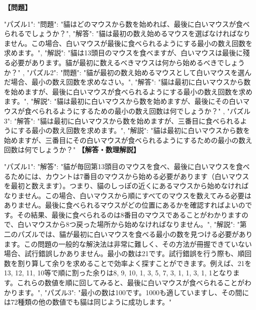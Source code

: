 \documentclass[10pt,a4paper,oneside,openany]{ltjsbook}
\begin{document}
\begin{tcolorbox}[colback=softblue,colframe=primaryblue,title=\textbf{第 232 問：CATCHING THE MICE.},arc=2mm,boxrule=1pt,breakable]
\textbf{【問題】}\par\vspace{0.3em}
{
  "パズル1": {
    "問題": "貓はどのマウスから数を始めれば、最後に白いマウスが食べられるでしょうか？",
    "解答": "貓は最初の数え始めるマウスを選ばなければなりません。この場合、白いマウスが最後に食べられるようにする最小の数え回数を求めます。",
    "解説": "貓は13頭目のマウスを食べますが、白いマウスは最後に殘る必要があります。貓が最初に数えるべきマウスは何から始めるべきでしょうか？"
  },
  "パズル2": {
    "問題": "貓が最初の数え始めるマウスとして白いマウスを選んだ場合、最小の数え回数を求めなさい。",
    "解答": "貓は最初に白いマウスから数を始めますが、最後に白いマウスが食べられるようにする最小の数え回数を求めます。",
    "解説": "貓は最初に白いマウスから数を始めますが、最後にその白いマウスが食べられるようにするための最小の数え回数は何でしょうか？"
  },
  "パズル3": {
    "解答": "貓は最初に白いマウスから数を始めますが、三番目に食べられるようにする最小の数え回数を求めます。",
    "解説": "貓は最初に白いマウスから数を始めますが、三番目にその白いマウスが食べられるようにするための最小の数え回数は何でしょうか？"
  }
}
\tcblower
\textbf{【解答・数理解説】}\par\vspace{0.3em}
{
"パズル1": {
"解答": "貓が毎回第13頭目のマウスを食べ、最後に白いマウスを食べるためには、カウントは7番目のマウスから始める必要があります（白いマウスを最初と数えます）。つまり、貓のしっぽの近くにあるマウスから始めなければなりません。この場合、白いマウスから順にすべてのマウスを数えてみる必要はありません。最後に食べられるマウスがどの位置にあるかを確認すればよいのです。その結果、最後に食べられるのは8番目のマウスであることがわかりますので、白いマウスから8つ戻った場所から始めなければなりません。",
"解説": "第二のパズルでは、貓が最初に白いマウスを食べる最小の数を見つける必要があります。この問題の一般的な解決法は非常に難しく、その方法が冊握できていない場合、試行錯誤しかありません。最小の数は21です。試行錯誤を行う際も、順回数を割り算して余りを求めることで効率よく探すことができます。例えば、21を13, 12, 11, 10等で順に割った余りは8, 9, 10, 1, 3, 5, 7, 3, 1, 1, 3, 1, 1となります。これらの数値を順に回してみると、最後に白いマウスが食べられることがわかります。",
"パズル3": "最小の数は100です。1000も適していますし、その間には72種類の他の数値でも貓は同じように成功します。"
}
}
\end{tcolorbox}
\end{document}
